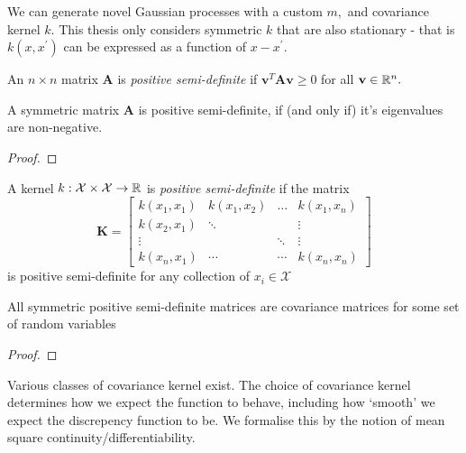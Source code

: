 We can generate novel Gaussian processes with a custom $m,$ and
covariance kernel $k.$ This thesis only considers symmetric
$k$ that are also stationary - that is $k(x, x^\prime)$ can be expressed as a
function of $x - x^\prime.$

\color{red}

\begin{definition}\label{def:pos_def_mat}
    An $n\times n$ matrix $\mathbf{A}$ is \emph{positive semi-definite} if
    $\mathbf{v}^T\mathbf{A}\mathbf{v} \geq 0$ for all $\mathbf{v}\in\mathbb{R}^n.$
\end{definition}

\begin{theorem}
    A symmetric matrix $\mathbf{A}$ is positive semi-definite, if (and only if)
    it's eigenvalues are non-negative.
\end{theorem}
\begin{proof}
\end{proof}

\begin{definition}\label{def:pos_def_ker}
    A kernel $k:\mathcal{X}\times\mathcal{X}\to\mathbb{R}$ is
    \emph{positive semi-definite} if the matrix
    $$\mathbf{K} = \begin{bmatrix}
            k(x_1, x_1) & k(x_1, x_2) & \dots  & k(x_1, x_n) \\
            k(x_2, x_1) & \ddots      &        & \vdots      \\
            \vdots      &             & \ddots & \vdots      \\
            k(x_n, x_1) & \cdots      & \cdots & k(x_n, x_n)
        \end{bmatrix}$$
    is positive semi-definite for any collection of $x_i\in\mathcal{X}$
\end{definition}

\begin{theorem}
    All symmetric positive semi-definite matrices are covariance matrices for
    some set of random variables
\end{theorem}
\begin{proof}
\end{proof}

\color{black}

Various classes of covariance kernel exist. The choice of covariance kernel determines how we expect the function to behave, including how `smooth' we expect the discrepency function to be. We formalise this by the notion of mean square continuity/differentiability.

